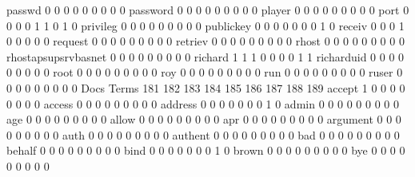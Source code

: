 \documentclass[compress,8pt]{beamer}
\begin{document}
\begin{frame}
\begin{Schunk}
  passwd                                     0   0   0   0   0   0   0   0   0
  password                                   0   0   0   0   0   0   0   0   0
  player                                     0   0   0   0   0   0   0   0   0
  port                                       0   0   0   0   1   1   0   1   0
  privileg                                   0   0   0   0   0   0   0   0   0
  publickey                                  0   0   0   0   0   0   0   1   0
  receiv                                     0   0   0   1   0   0   0   0   0
  request                                    0   0   0   0   0   0   0   0   0
  retriev                                    0   0   0   0   0   0   0   0   0
  rhost                                      0   0   0   0   0   0   0   0   0
  rhostapsupsrvbasnet                        0   0   0   0   0   0   0   0   0
  richard                                    1   1   1   0   0   0   0   1   1
  richarduid                                 0   0   0   0   0   0   0   0   0
  root                                       0   0   0   0   0   0   0   0   0
  roy                                        0   0   0   0   0   0   0   0   0
  run                                        0   0   0   0   0   0   0   0   0
  ruser                                      0   0   0   0   0   0   0   0   0
                                          Docs
Terms                                      181 182 183 184 185 186 187 188 189
  accept                                     1   0   0   0   0   0   0   0   0
  access                                     0   0   0   0   0   0   0   0   0
  address                                    0   0   0   0   0   0   0   1   0
  admin                                      0   0   0   0   0   0   0   0   0
  age                                        0   0   0   0   0   0   0   0   0
  allow                                      0   0   0   0   0   0   0   0   0
  apr                                        0   0   0   0   0   0   0   0   0
  argument                                   0   0   0   0   0   0   0   0   0
  auth                                       0   0   0   0   0   0   0   0   0
  authent                                    0   0   0   0   0   0   0   0   0
  bad                                        0   0   0   0   0   0   0   0   0
  behalf                                     0   0   0   0   0   0   0   0   0
  bind                                       0   0   0   0   0   0   0   1   0
  brown                                      0   0   0   0   0   0   0   0   0
  bye                                        0   0   0   0   0   0   0   0   0

\end{Schunk}
\end{frame}
\end{document}

